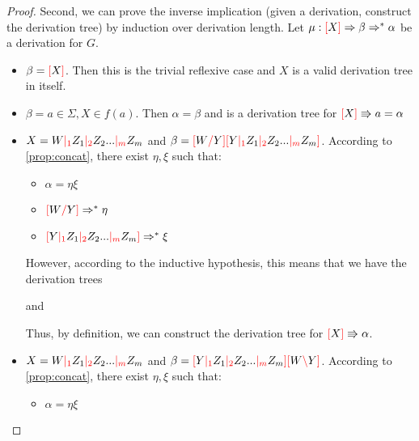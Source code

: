\documentclass[main.tex]{subfiles}
\begin{document}
\begin{proof}
    Second, we can prove the inverse implication (given a derivation,
    construct the derivation tree) by induction over derivation
    length. Let $\mu: \textcolor{red}{[} X \textcolor{red}{]} \Rightarrow \beta \Rightarrow^* \alpha$
    be a derivation for $G$.
    \begin{itemize}
        \item $\beta = \textcolor{red}{[} X \textcolor{red}{]}$. Then this is the trivial reflexive case
            and $X$ is a valid derivation tree in itself.
        \item $\beta = a \in \Sigma, X \in f(a)$. Then $\alpha = \beta$ and
            is a derivation tree for $ \textcolor{red}{[} X \textcolor{red}{]} \Rrightarrow a = \alpha $
        \item $X = W \textcolor{red}{|_{1}} Z_1 \textcolor{red}{|_{2}} Z_2 ... \textcolor{red}{|_{m}} Z_m$ and
            $\beta = \textcolor{red}{[} W \textcolor{red}{/} Y \textcolor{red}{]} \textcolor{red}{[} Y \textcolor{red}{|_{1}} Z_1 \textcolor{red}{|_{2}} Z_2 ... \textcolor{red}{|_{m}} Z_m \textcolor{red}{]}$.
            According to \cref{prop:concat}, there exist $\eta, \xi$ such that:
            \begin{itemize}
                \item $\alpha = \eta \xi$
                \item $\textcolor{red}{[} W \textcolor{red}{/} Y \textcolor{red}{]} \Rightarrow^* \eta$
                \item $\textcolor{red}{[} Y \textcolor{red}{|_{1}} Z_1 \textcolor{red}{|_{2}} Z_2 ... \textcolor{red}{|_{m}} Z_m \textcolor{red}{]} \Rightarrow^* \xi$
            \end{itemize}
            However, according to the inductive hypothesis, this means that we
            have the derivation trees
            \begin{center}
                and
            \end{center}
            Thus, by definition, we can construct the derivation tree
            for $\textcolor{red}{[} X \textcolor{red}{]} \Rrightarrow \alpha$.
        \item $X = W \textcolor{red}{|_{1}} Z_1 \textcolor{red}{|_{2}} Z_2 ... \textcolor{red}{|_{m}} Z_m$ and
            $\beta = \textcolor{red}{[} Y \textcolor{red}{|_{1}} Z_1 \textcolor{red}{|_{2}} Z_2 ... \textcolor{red}{|_{m}} Z_m \textcolor{red}{]} \textcolor{red}{[} W \textcolor{red}{\backslash} Y \textcolor{red}{]}$.
            According to \cref{prop:concat}, there exist $\eta, \xi$ such that:
            \begin{itemize}
                \item $\alpha = \eta \xi$

\end{itemize}
\end{itemize}
\end{proof}
\end{document}
